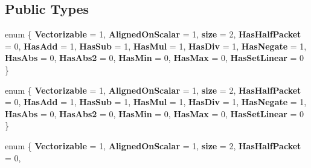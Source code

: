 \subsection*{Public Types}
\begin{DoxyCompactItemize}
\item 
\mbox{\label{struct_eigen_1_1internal_1_1packet__traits_3_01std_1_1complex_3_01float_01_4_01_4_a1d35c4cc64ad0ef886063aca05852957}} 
enum \{ \newline
{\bfseries Vectorizable} = 1, 
{\bfseries Aligned\+On\+Scalar} = 1, 
{\bfseries size} = 2, 
{\bfseries Has\+Half\+Packet} = 0, 
\newline
{\bfseries Has\+Add} = 1, 
{\bfseries Has\+Sub} = 1, 
{\bfseries Has\+Mul} = 1, 
{\bfseries Has\+Div} = 1, 
\newline
{\bfseries Has\+Negate} = 1, 
{\bfseries Has\+Abs} = 0, 
{\bfseries Has\+Abs2} = 0, 
{\bfseries Has\+Min} = 0, 
\newline
{\bfseries Has\+Max} = 0, 
{\bfseries Has\+Set\+Linear} = 0
 \}
\item 
\mbox{\label{struct_eigen_1_1internal_1_1packet__traits_3_01std_1_1complex_3_01float_01_4_01_4_a08a9d18a28088c75b0ac572dfb9961c0}} 
enum \{ \newline
{\bfseries Vectorizable} = 1, 
{\bfseries Aligned\+On\+Scalar} = 1, 
{\bfseries size} = 2, 
{\bfseries Has\+Half\+Packet} = 0, 
\newline
{\bfseries Has\+Add} = 1, 
{\bfseries Has\+Sub} = 1, 
{\bfseries Has\+Mul} = 1, 
{\bfseries Has\+Div} = 1, 
\newline
{\bfseries Has\+Negate} = 1, 
{\bfseries Has\+Abs} = 0, 
{\bfseries Has\+Abs2} = 0, 
{\bfseries Has\+Min} = 0, 
\newline
{\bfseries Has\+Max} = 0, 
{\bfseries Has\+Set\+Linear} = 0
 \}
\item 
\mbox{\label{struct_eigen_1_1internal_1_1packet__traits_3_01std_1_1complex_3_01float_01_4_01_4_a9daf7160f7194cb9e5323eac655d687b}} 
enum \{ \newline
{\bfseries Vectorizable} = 1, 
{\bfseries Aligned\+On\+Scalar} = 1, 
{\bfseries size} = 2, 
{\bfseries Has\+Half\+Packet} = 0, 
\newline

\end{DoxyCompactItemize}
